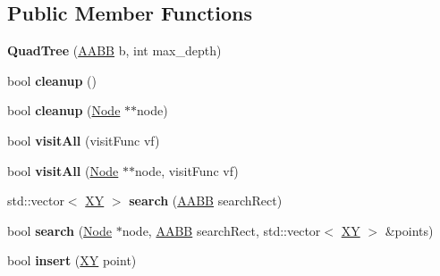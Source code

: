 \subsection*{Public Member Functions}
\begin{DoxyCompactItemize}
\item 
\hypertarget{classbali_1_1_quad_tree_aa5c83dfc5cc3d48bf616ccddb3d6d32d}{{\bfseries Quad\-Tree} (\hyperlink{classbali_1_1_a_a_b_b}{A\-A\-B\-B} b, int max\-\_\-depth)}\label{classbali_1_1_quad_tree_aa5c83dfc5cc3d48bf616ccddb3d6d32d}

\item 
\hypertarget{classbali_1_1_quad_tree_a81585ab207e0a07a21faed03297ab3af}{bool {\bfseries cleanup} ()}\label{classbali_1_1_quad_tree_a81585ab207e0a07a21faed03297ab3af}

\item 
\hypertarget{classbali_1_1_quad_tree_a821750aa616bc47404b1ab49d27ed9d3}{bool {\bfseries cleanup} (\hyperlink{classbali_1_1_node}{Node} $\ast$$\ast$node)}\label{classbali_1_1_quad_tree_a821750aa616bc47404b1ab49d27ed9d3}

\item 
\hypertarget{classbali_1_1_quad_tree_a2dd623bbd803b1e4a09745a4f1c25d51}{bool {\bfseries visit\-All} (visit\-Func vf)}\label{classbali_1_1_quad_tree_a2dd623bbd803b1e4a09745a4f1c25d51}

\item 
\hypertarget{classbali_1_1_quad_tree_a36268f7134c0581c02eb41d5c05ef66d}{bool {\bfseries visit\-All} (\hyperlink{classbali_1_1_node}{Node} $\ast$$\ast$node, visit\-Func vf)}\label{classbali_1_1_quad_tree_a36268f7134c0581c02eb41d5c05ef66d}

\item 
\hypertarget{classbali_1_1_quad_tree_aecf3bb3b4e1453e5660f41b55cfeb0e2}{std\-::vector$<$ \hyperlink{classbali_1_1_x_y}{X\-Y} $>$ {\bfseries search} (\hyperlink{classbali_1_1_a_a_b_b}{A\-A\-B\-B} search\-Rect)}\label{classbali_1_1_quad_tree_aecf3bb3b4e1453e5660f41b55cfeb0e2}

\item 
\hypertarget{classbali_1_1_quad_tree_a73afdaf96545841fda9579dbdb1968a3}{bool {\bfseries search} (\hyperlink{classbali_1_1_node}{Node} $\ast$node, \hyperlink{classbali_1_1_a_a_b_b}{A\-A\-B\-B} search\-Rect, std\-::vector$<$ \hyperlink{classbali_1_1_x_y}{X\-Y} $>$ \&points)}\label{classbali_1_1_quad_tree_a73afdaf96545841fda9579dbdb1968a3}

\item 
\hypertarget{classbali_1_1_quad_tree_ad5201e22e625642c7460aca991b350b6}{bool {\bfseries insert} (\hyperlink{classbali_1_1_x_y}{X\-Y} point)}\label{classbali_1_1_quad_tree_ad5201e22e625642c7460aca991b350b6}


\end{DoxyCompactItemize}
